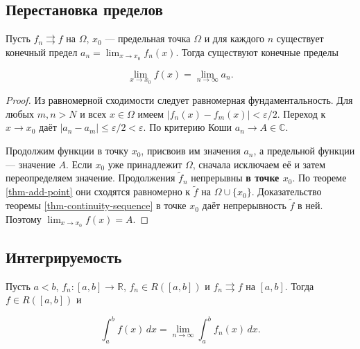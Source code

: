 \subsection{Перестановка пределов}\label{sec-sequences-02-4}

\begin{cor}\label{cor-interchange-limits}

Пусть \(f_n\rightrightarrows f\) на \(\Omega\), \(x_0\) --- предельная точка \(\Omega\) и для каждого \(n\) существует конечный предел \(a_n=\lim_{x\to x_0}f_n(x)\). Тогда существуют конечные пределы

\begin{equation}
\lim_{x\to x_0}f(x)=\lim_{n\to\infty}a_n.
\label{eq-interchange-limits}
\end{equation}

\end{cor}

\begin{proof}

Из равномерной сходимости следует равномерная фундаментальность. Для любых \(m,n>N\) и всех \(x\in\Omega\) имеем \(|f_n(x)-f_m(x)|<\varepsilon/2\). Переход к \(x\to x_0\) даёт \(|a_n-a_m|\le\varepsilon/2<\varepsilon\). По критерию Коши \(a_n\to A\in\mathbb C\).

Продолжим функции в точку \(x_0\), присвоив им значения \(a_n\), а предельной функции --- значение \(A\). Если \(x_0\) уже принадлежит \(\Omega\), сначала исключаем её и затем переопределяем значение. Продолжения \(\widetilde f_n\) непрерывны \textbf{в точке \(x_0\)}. По теореме \ref{thm-add-point} они сходятся равномерно к \(\widetilde f\) на \(\Omega\cup\{x_0\}\). Доказательство теоремы \ref{thm-continuity-sequence} в точке \(x_0\) даёт непрерывность \(\widetilde f\) в ней. Поэтому \(\lim_{x\to x_0}f(x)=A\).

\end{proof}

\subsection{Интегрируемость}\label{sec-sequences-02-5}

\begin{theorem}\label{thm-integrate-sequence}

Пусть \(a<b\), \(f_n:[a,b]\to\mathbb R\), \(f_n\in R([a,b])\) и \(f_n\rightrightarrows f\) на \([a,b]\). Тогда \(f\in R([a,b])\) и

\begin{equation}
\int_a^b f(x)\,dx=\lim_{n\to\infty}\int_a^b f_n(x)\,dx.
\label{eq-integrate-sequence}
\end{equation}

\end{theorem}

